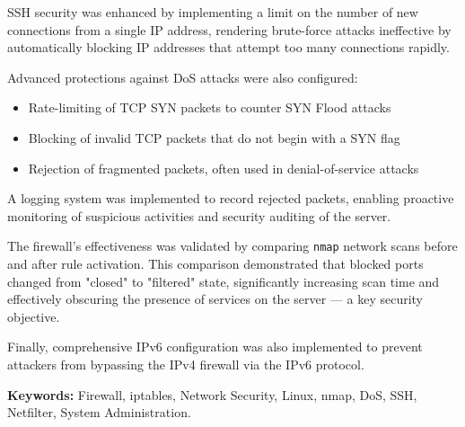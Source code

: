 SSH security was enhanced by implementing a limit on the number of new connections from a single IP address, rendering brute-force attacks ineffective by automatically blocking IP addresses that attempt too many connections rapidly.

Advanced protections against DoS attacks were also configured:
\begin{itemize}
    \item Rate-limiting of TCP SYN packets to counter SYN Flood attacks
    \item Blocking of invalid TCP packets that do not begin with a SYN flag
    \item Rejection of fragmented packets, often used in denial-of-service attacks
\end{itemize}

A logging system was implemented to record rejected packets, enabling proactive monitoring of suspicious activities and security auditing of the server.

The firewall's effectiveness was validated by comparing \texttt{nmap} network scans before and after rule activation. This comparison demonstrated that blocked ports changed from "closed" to "filtered" state, significantly increasing scan time and effectively obscuring the presence of services on the server — a key security objective.

Finally, comprehensive IPv6 configuration was also implemented to prevent attackers from bypassing the IPv4 firewall via the IPv6 protocol.

\vspace{1.5cm}
\noindent\textbf{Keywords:} Firewall, iptables, Network Security, Linux, nmap, DoS, SSH, Netfilter, System Administration.
